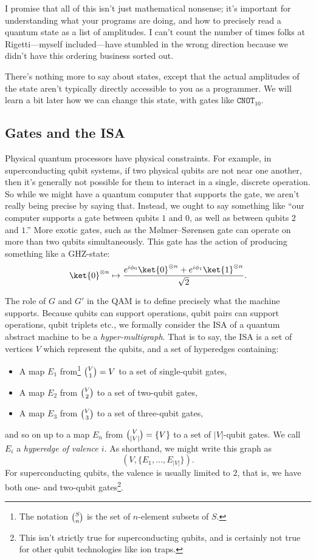 I promise that all of this isn't just mathematical nonsense; it's important for understanding what your programs are doing, and how to precisely read a quantum state as a list of amplitudes. I can't count the number of times folks at Rigetti---myself included---have stumbled in the wrong direction because we didn't have this ordering business sorted out.

There's nothing more to say about states, except that the actual amplitudes of the state aren't typically directly accessible to you as a programmer. We will learn a bit later how we can change this state, with gates like $\texttt{CNOT}_{10}$.

\subsection{Gates and the ISA}
Physical quantum processors have physical constraints. For example, in superconducting qubit systems, if two physical qubits are not near one another, then it's generally not possible for them to interact in a single, discrete operation. So while we might have a quantum computer that supports the \CNOT{} gate, we aren't really being precise by saying that. Instead, we ought to say something like ``our computer supports a \CNOT{} gate between qubits $1$ and $0$, as well as between qubits $2$ and $1$.'' More exotic gates, such as the M{\o}lmer--S{\o}rensen gate\cite{molmer} can operate on more than two qubits simultaneously. This gate has the action of producing something like a GHZ-state:
\begin{displaymath}
\ket{0}^{\otimes n} \mapsto \frac{e^{i\phi_0}\ket{0}^{\otimes n} + e^{i\phi_1}\ket{1}^{\otimes n}}{\sqrt{2}}.
\end{displaymath}

The role of $G$ and $G'$ in the QAM is to define precisely what the machine supports. Because qubits can support operations, qubit pairs can support operations, qubit triplets etc., we formally consider the ISA of a quantum abstract machine to be a \emph{hyper-multigraph}. That is to say, the ISA is a set of vertices $V$ which represent the qubits, and a set of hyperedges containing:
\begin{itemize}
    \item A map $E_1$ from\footnote{The notation $\tbinom S n$ is the set of $n$-element subsets of $S$.} $\tbinom V 1 = V$ to a set of single-qubit gates,
    \item A map $E_2$ from $\tbinom V 2$ to a set of two-qubit gates,
    \item A map $E_3$ from $\tbinom V 3$ to a set of three-qubit gates,
\end{itemize}
and so on up to a map $E_n$ from $\tbinom V {\vert V\vert} = \{V\}$ to a set of $\vert V\vert$-qubit gates. We call $E_i$ a \emph{hyperedge of valence $i$}. As shorthand, we might write this graph as \[\left(V,\{E_1,\ldots,E_{\vert V\vert}\}\right).\] For superconducting qubits, the valence is usually limited to $2$, that is, we have both one- and two-qubit gates\footnote{This isn't strictly true for superconducting qubits, and is certainly not true for other qubit technologies like ion traps.}.

